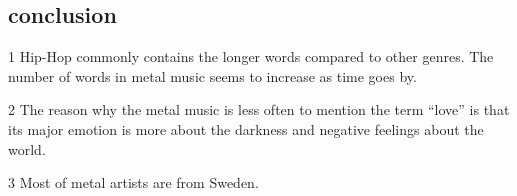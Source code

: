 \documentclass[]{article}
\begin{document}
\hypertarget{conclusion}{%
\subsection{conclusion}\label{conclusion}}

1 Hip-Hop commonly contains the longer words compared to other genres.
The number of words in metal music seems to increase as time goes by.

2 The reason why the metal music is less often to mention the term
``love'' is that its major emotion is more about the darkness and
negative feelings about the world.

3 Most of metal artists are from Sweden.
\end{document}
